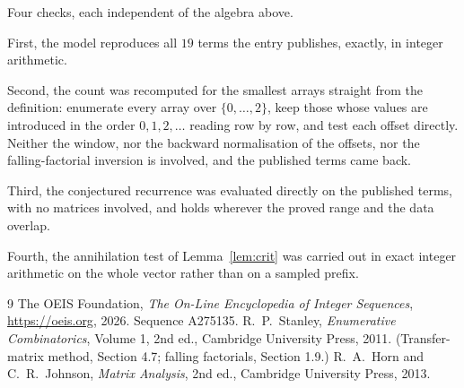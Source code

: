 \documentclass[11pt,a4paper]{article}
\theoremstyle{plain}
\theoremstyle{definition}
\begin{document}
Four checks, each independent of the algebra above.

First, the model reproduces all $19$ terms the entry publishes, exactly, in integer
arithmetic.

Second, the count was recomputed for the smallest arrays straight from the definition:
enumerate every array over $\{0,\dots,2\}$, keep those whose values are introduced in the
order $0,1,2,\dots$ reading row by row, and test each offset directly. Neither the window, nor
the backward normalisation of the offsets, nor the falling-factorial inversion is involved, and
the published terms came back.

Third, the conjectured recurrence was evaluated directly on the published terms, with no
matrices involved, and holds wherever the proved range and the data overlap.

Fourth, the annihilation test of Lemma~\ref{lem:crit} was carried out in exact integer
arithmetic on the whole vector rather than on a sampled prefix.

\begin{thebibliography}{9}
 The OEIS Foundation, \emph{The On-Line Encyclopedia of Integer
Sequences}, \url{https://oeis.org}, 2026. Sequence A275135.
 R.~P.~Stanley, \emph{Enumerative Combinatorics}, Volume 1, 2nd ed.,
Cambridge University Press, 2011. (Transfer-matrix method, Section 4.7; falling factorials,
Section 1.9.)
 R.~A.~Horn and C.~R.~Johnson, \emph{Matrix Analysis}, 2nd ed., Cambridge
University Press, 2013.
\end{thebibliography}
\end{document}
